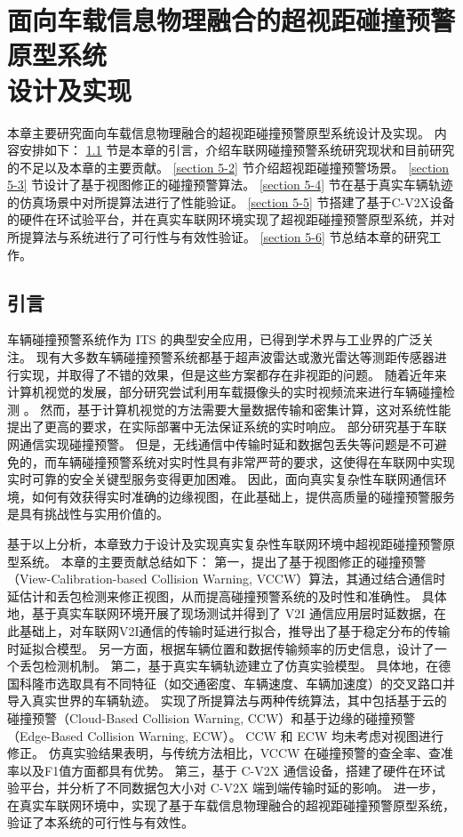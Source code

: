 \chapter[面向车载信息物理融合的超视距碰撞预警原型系统设计及实现]{面向车载信息物理融合的超视距碰撞预警原型系统\\设计及实现}
本章主要研究面向车载信息物理融合的超视距碰撞预警原型系统设计及实现。
内容安排如下：
\ref{section 5-1} 节是本章的引言，介绍车联网碰撞预警系统研究现状和目前研究的不足以及本章的主要贡献。
\ref{section 5-2} 节介绍超视距碰撞预警场景。
\ref{section 5-3} 节设计了基于视图修正的碰撞预警算法。
\ref{section 5-4} 节在基于真实车辆轨迹的仿真场景中对所提算法进行了性能验证。
\ref{section 5-5} 节搭建了基于C-V2X设备的硬件在环试验平台，并在真实车联网环境实现了超视距碰撞预警原型系统，并对所提算法与系统进行了可行性与有效性验证。
\ref{section 5-6} 节总结本章的研究工作。

\section{引言}\label{section 5-1}

车辆碰撞预警系统作为 ITS 的典型安全应用，已得到学术界与工业界的广泛关注。
现有大多数车辆碰撞预警系统都基于超声波雷达或激光雷达等测距传感器进行实现\cite{song2018real, wu2019series}，并取得了不错的效果，但是这些方案都存在非视距的问题。
随着近年来计算机视觉的发展，部分研究尝试利用车载摄像头的实时视频流来进行车辆碰撞检测 \cite{wang2016vision, song2018lane}。
然而，基于计算机视觉的方法需要大量数据传输和密集计算，这对系统性能提出了更高的要求，在实际部署中无法保证系统的实时响应。 
部分研究基于车联网通信实现碰撞预警\cite{hafner2013cooperative, gelbal2017elastic}。
但是，无线通信中传输时延和数据包丢失等问题是不可避免的，而车辆碰撞预警系统对实时性具有非常严苛的要求，这使得在车联网中实现实时可靠的安全关键型服务变得更加困难。
因此，面向真实复杂性车联网通信环境，如何有效获得实时准确的边缘视图，在此基础上，提供高质量的碰撞预警服务是具有挑战性与实用价值的。

基于以上分析，本章致力于设计及实现真实复杂性车联网环境中超视距碰撞预警原型系统。
本章的主要贡献总结如下：
第一，提出了基于视图修正的碰撞预警（View-Calibration-based Collision Warning, VCCW）算法，其通过结合通信时延估计和丢包检测来修正视图，从而提高碰撞预警系统的及时性和准确性。
具体地，基于真实车联网环境开展了现场测试并得到了 V2I 通信应用层时延数据，在此基础上，对车联网V2I通信的传输时延进行拟合，推导出了基于稳定分布的传输时延拟合模型。
另一方面，根据车辆位置和数据传输频率的历史信息，设计了一个丢包检测机制。
第二，基于真实车辆轨迹建立了仿真实验模型。
具体地，在德国科隆市选取具有不同特征（如交通密度、车辆速度、车辆加速度）的交叉路口并导入真实世界的车辆轨迹。
实现了所提算法与两种传统算法，其中包括基于云的碰撞预警（Cloud-Based Collision Warning, CCW）和基于边缘的碰撞预警（Edge-Based Collision Warning, ECW）。
CCW 和 ECW 均未考虑对视图进行修正。
仿真实验结果表明，与传统方法相比，VCCW 在碰撞预警的查全率、查准率以及F1值方面都具有优势。
第三，基于 C-V2X 通信设备，搭建了硬件在环试验平台，并分析了不同数据包大小对 C-V2X 端到端传输时延的影响。
进一步，在真实车联网环境中，实现了基于车载信息物理融合的超视距碰撞预警原型系统，验证了本系统的可行性与有效性。

